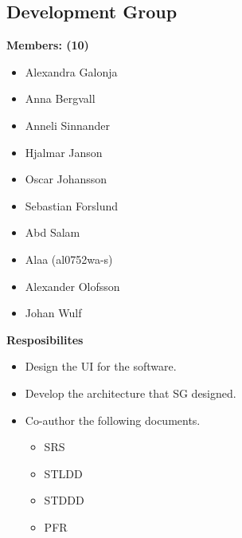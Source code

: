 \documentclass{article}
\begin{document}
    \subsection{Development Group}
        \textbf{Members: (10)}
        \begin{itemize}
            \item Alexandra Galonja
            \item Anna Bergvall
            \item Anneli Sinnander
            \item Hjalmar Janson
            \item Oscar Johansson
            \item Sebastian Forslund
            \item Abd Salam
            \item Alaa (al0752wa-s)
            \item Alexander Olofsson
            \item Johan Wulf
        \end{itemize}
        \textbf{Resposibilites}
        \begin{itemize}
            \item Design the UI for the software.
            \item Develop the architecture that SG designed.
            \item Co-author the following documents.
                \begin{itemize}
                    \item SRS
                    \item STLDD
                    \item STDDD
                    \item PFR
                \end{itemize}
        \end{itemize}
    
\end{document}

